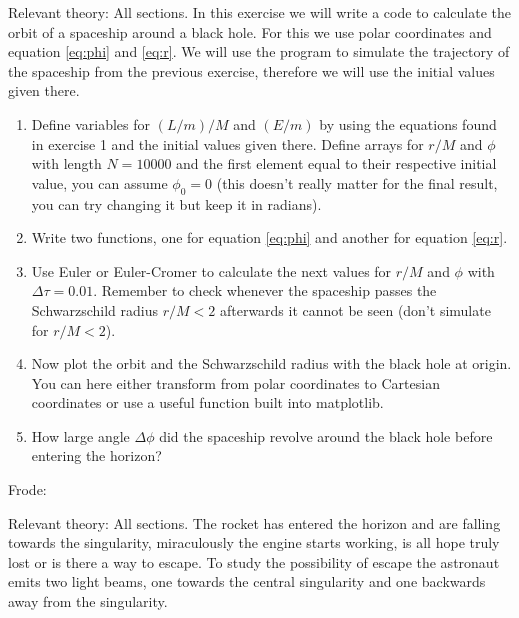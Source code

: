 {\begin{multicols}{2}
Relevant theory: All sections.\newline
In this exercise we will write a code to calculate the orbit of a spaceship around a black hole. For this we use polar coordinates and equation \ref{eq:phi} and \ref{eq:r}. We will use the program to simulate the trajectory of the spaceship from the previous exercise, therefore we will use the initial values given there.
\begin{enumerate}
\item Define variables for $(L/m)/M$ and $(E/m)$ by using the equations found in exercise 1 and the initial values given there. Define arrays for $r/M$ and $\phi$ with length $N=10000$ and the first element equal to their respective initial value, you can assume $\phi_0=0$ (this doesn't really matter for the final result, you can try changing it but keep it in radians).
\item Write two functions, one for equation \ref{eq:phi} and another for equation \ref{eq:r}.
\item Use Euler or Euler-Cromer to calculate the next values for $r/M$ and $\phi$ with $\Delta \tau=0.01$. Remember to check whenever the spaceship passes the Schwarzschild radius $r/M<2$ afterwards it cannot be seen (don't simulate for $r/M<2$).
\item Now plot the orbit and the Schwarzschild radius with the black hole at origin. You can here either transform from polar coordinates to Cartesian coordinates or use a useful function built into matplotlib.
\item How large angle $\Delta\phi$ did the spaceship revolve around the black hole before entering the horizon?
\end{enumerate}
Frode:

\vspace{0.5cm}


Relevant theory: All sections.\newline
The rocket has entered the horizon and are falling towards the singularity, miraculously the engine starts working, is all hope truly lost or is there a way to escape. To study the possibility of escape the astronaut emits two light beams, one towards the central singularity and one backwards away from the singularity. 


\end{multicols}}
